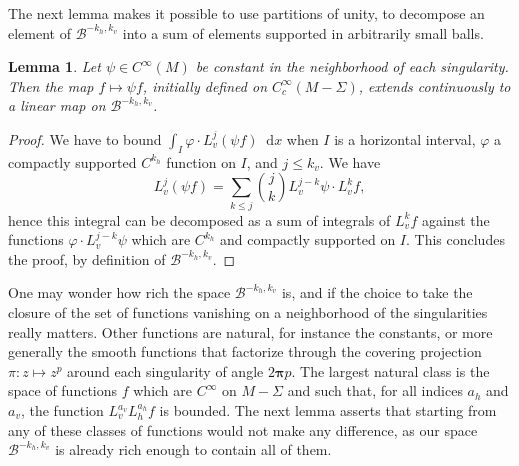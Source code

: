 \documentclass[JEP,XML,SOM,Unicode]{cedram}
\newcommand{\boB}{\mathcal{B}}
\newcommand{\dd}{\mathop{}\!\mathrm{d}}
\newcommand{\bpi}{\boldsymbol{\pi}}
\let\phi\varphi
\newtheorem{lem}[thm]{Lemma}
\theoremstyle{definition}
\numberwithin{equation}{section}
\begin{document}
The next lemma makes it possible to use partitions of unity, to decompose an
element of $\boB^{-k_h, k_v}$ into a sum of elements supported in arbitrarily
small balls.
\begin{lem}
\label{lem:partition_unite} Let $\psi \in C^\infty(M)$ be constant in the
neighborhood of each singularity. Then the map $f \mapsto \psi f$, initially
defined on $C^\infty_c(M-\Sigma)$, extends continuously to a linear map on
$\boB^{-k_h, k_v}$.
\end{lem}
\begin{proof}
We have to bound $\int_I \phi \cdot L_v^j(\psi f) \dd x$ when $I$ is a
horizontal interval, $\phi$ a compactly supported $C^{k_h}$ function on $I$,
and $j\leq k_v$. We have
\[
L_v^j(\psi f) = \sum_{k\leq j}\binom{j}{k}
L_v^{j-k}\psi \cdot L_v^k f,
\]
hence this integral can be decomposed as a sum
of integrals of $L_v^k f$ against the functions $\phi \cdot L_v^{j-k}\psi$
which are $C^{k_h}$ and compactly supported on $I$. This concludes the proof,
by definition of $\boB^{-k_h, k_v}$.
\end{proof}

One may wonder how rich the space $\boB^{-k_h, k_v}$ is, and if the choice to
take the closure of the set of functions vanishing on a neighborhood of the
singularities really matters. Other functions are natural, for instance the
constants, or more generally the smooth functions that factorize through the
covering projection $\pi: z \mapsto z^p$ around each singularity of angle
$2\bpi p$. The largest natural class is the space of functions $f$ which are
$C^\infty$ on $M-\Sigma$ and such that, for all indices $a_h$ and $a_v$, the
function $L_v^{a_v} L_h^{a_h} f$ is bounded. The next lemma asserts that
starting from any of these classes of functions would not make any
difference, as our space $\boB^{-k_h, k_v}$ is already rich enough to contain
all of them.
\end{document}
